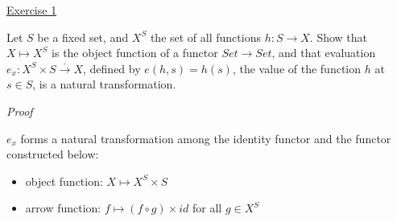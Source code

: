 \noindent
\underline{Exercise 1}
\vspace{2mm}

Let $S$ be a fixed set, and $X^S$ the set of all functions $h: S \rightarrow X$. Show that $X \mapsto X^S$
is the object function of a functor $Set \rightarrow Set$, and that evaluation $e_x : X^S \times S \xrightarrow{.} X$,
defined by $e(h, s) = h(s)$, the value of the function $h$ at $s \in S$, is a natural transformation.

\vspace{2mm}

\noindent
\emph{Proof}

$e_x$ forms a natural transformation among the identity functor and the functor constructed below:
\begin{itemize}
	\item object function: $X \mapsto X^S \times S$
	\item arrow function: $f \mapsto (f \circ g) \times id$ for all $g \in X^S$
\end{itemize}

\vspace{2mm}
